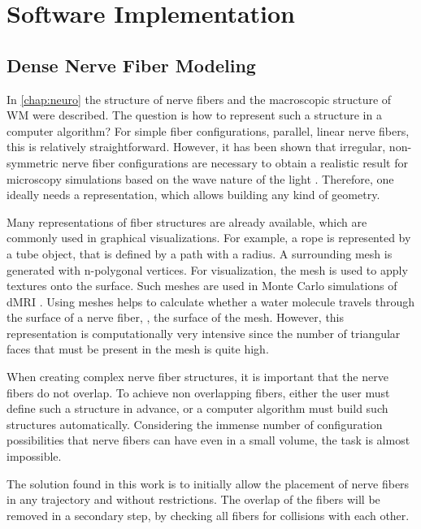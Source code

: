 \newpage\null\thispagestyle{empty}\newpage
\clearpage{\thispagestyle{empty}\cleardoublepage}
\part{Software Implementation}
\parttoc
%
%
%
\setcounter{chapter}{4}
\chapter{Dense Nerve Fiber Modeling}
\label{chap:sof:modeling}
%
In \cref{chap:neuro} the structure of nerve fibers and the macroscopic structure of \ac{WM} were described.
The question is how to represent such a structure in a computer algorithm?
For simple fiber configurations, \eg{} parallel, linear nerve fibers, this is relatively straightforward.
However, it has been shown that irregular, non-symmetric nerve fiber configurations are necessary to obtain a realistic result for microscopy simulations based on the wave nature of the light \cite{MenzelDissertation}.
Therefore, one ideally needs a representation, which allows building any kind of geometry.
\par
%
Many representations of fiber structures are already available, which are commonly used in graphical visualizations.
For example, a rope is represented by a tube object, that is defined by a path with a radius.
A surrounding mesh is generated with n-polygonal vertices.
For visualization, the mesh is used to apply textures onto the surface.
Such meshes are \eg{} used in Monte Carlo simulations of \ac{dMRI} \cite{Ginsburger2019,ginsburgerDis2019}.
Using meshes helps to calculate whether a water molecule travels through the surface of a nerve fiber, \ie{}, the surface of the mesh.
However, this representation is computationally very intensive since the number of triangular faces that must be present in the mesh is quite high.
\par
%
When creating complex nerve fiber structures, it is important that the nerve fibers do not overlap.
To achieve non overlapping fibers, either the user must define such a structure in advance, or a computer algorithm must build such structures automatically.
Considering the immense number of configuration possibilities that nerve fibers can have even in a small volume, the task is almost impossible.
\par
%
The solution found in this work is to initially allow the placement of nerve fibers in any trajectory and without restrictions.
The overlap of the fibers will be removed in a secondary step, by checking all fibers for collisions with each other.
